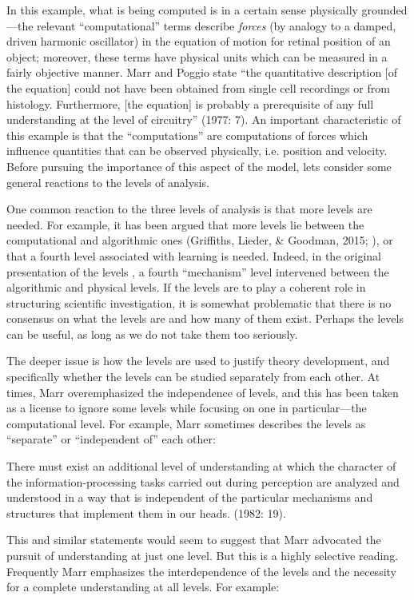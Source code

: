 In this example, what is being computed is in a certain sense physically grounded—the relevant “computational” terms describe \textit{forces} (by analogy to a damped, driven harmonic oscillator) in the equation of motion for retinal position of an object; moreover, these terms have physical units which can be measured in a fairly objective manner. Marr and Poggio state “the quantitative description [of the equation] could not have been obtained from single cell recordings or from histology. Furthermore, [the equation] is probably a prerequisite of any full understanding at the level of circuitry” (1977: 7). An important characteristic of this example is that the “computations” are computations of forces which influence quantities that can be observed physically, i.e. position and velocity. Before pursuing the importance of this aspect of the model, lets consider some general reactions to the levels of analysis.

One common reaction to the three levels of analysis is that more levels are needed. For example, it has been argued that more levels lie between the computational and algorithmic ones (Griffiths, Lieder, \& Goodman, 2015; \citealt{Pylyshyn1984}), or that a fourth level associated with learning is needed. Indeed, in the original presentation of the levels \citep{MarrPoggio1977}, a fourth “mechanism” level intervened between the algorithmic and physical levels. If the levels are to play a coherent role in structuring scientific investigation, it is somewhat problematic that there is no consensus on what the levels are and how many of them exist. Perhaps the levels can be useful, as long as we do not take them too seriously.

The deeper issue is how the levels are used to justify theory development, and specifically whether the levels can be studied separately from each other. At times, Marr overemphasized the independence of levels, and this has been taken as a license to ignore some levels while focusing on one in particular—the computational level. For example, Marr sometimes describes the levels as “separate” or “independent of” each other:

There must exist an additional level of understanding at which the character of the information-processing tasks carried out during perception are analyzed and understood in a way that is independent of the particular mechanisms and structures that implement them in our heads. (1982: 19).

This and similar statements would seem to suggest that Marr advocated the pursuit of understanding at just one level. But this is a highly selective reading. Frequently Marr emphasizes the interdependence of the levels and the necessity for a complete understanding at all levels. For example:

